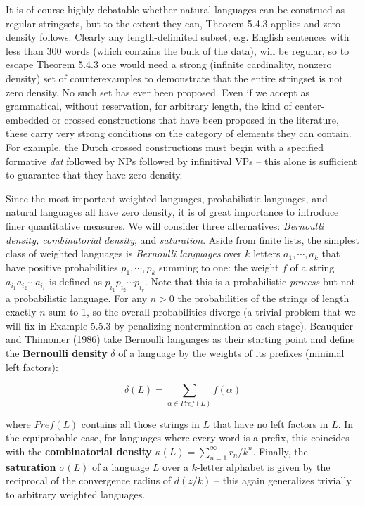 It is of course highly debatable whether natural languages can be construed as
regular stringsets, but to the extent they can, Theorem 5.4.3 applies and zero
density follows. Clearly any length-delimited subset, e.g. English sentences
with less than 300 words (which contains the bulk of the data), will be
regular, so to escape Theorem 5.4.3 one would need a strong (infinite
cardinality, nonzero density) set of counterexamples to demonstrate that the
entire stringset is not zero density. No such set has ever been proposed. Even
if we accept as grammatical, without reservation, for arbitrary length, the
kind of center-embedded or crossed constructions that have been proposed in the
literature, these carry very strong conditions on the category of elements
they can contain. For example, the Dutch crossed constructions must begin with
a specified formative {\it dat} followed by NPs followed by infinitival VPs --
this alone is sufficient to guarantee that they have zero density.

Since the most important weighted languages, probabilistic languages, and
natural languages all have zero density, it is of great importance to
introduce finer quantitative measures. We will consider three alternatives:
{\it Bernoulli density, combinatorial density}, and {\it saturation}.  Aside
from finite lists, the simplest class of weighted languages is {\it Bernoulli
  languages} over $k$ letters $a_1, \cdots , a_k$ that have positive
probabilities $p_1, \cdots, p_k$ summing to one: the weight $f$ of a string
$a_{i_1}a_{i_2} \cdots a_{i_r}$ is defined as $p_{i_1}p_{i_2} \cdots p_{i_r}$.
Note that this is a probabilistic {\it process} but not a probabilistic
language. For any $n >0 $ the probabilities of the strings of length exactly
$n$ sum to 1, so the overall probabilities diverge (a trivial problem that we
will fix in Example 5.5.3 by penalizing nontermination at each stage).
Beauquier and Thimonier (1986) take Bernoulli languages as their starting
point and define the {\bf Bernoulli density} $\delta$ of a language by the
weights of its prefixes (minimal left factors):

\begin{equation}
\delta(L) = \sum_{\alpha \in Pref(L)} f(\alpha)
\end{equation}

\smallskip
\noindent
where $\textit{Pref}(L)$ contains all those strings in $L$ that have no left
factors in $L$. In the equiprobable case, for languages where every word is a
prefix, this coincides with the {\bf combinatorial density}
$\kappa(L)=\sum_{n=1}^{\infty} r_n/k^n$. Finally, the {\bf saturation}
$\sigma(L)$ of a language $L$ over a $k$-letter alphabet is given by the
reciprocal of the convergence radius of $d(z/k)$ -- this again generalizes
trivially to arbitrary weighted languages.
 

